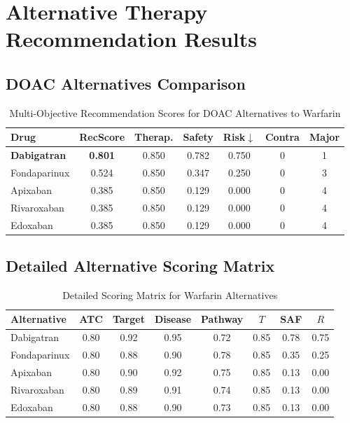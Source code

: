 \documentclass[11pt,a4paper]{article}
\begin{document}
\section{Alternative Therapy Recommendation Results}

\subsection{DOAC Alternatives Comparison}

\begin{table}[H]
\centering
\caption{Multi-Objective Recommendation Scores for DOAC Alternatives to Warfarin}
\label{tab:doac_alternatives}
\begin{tabular}{@{}lcccccc@{}}
\toprule
\textbf{Drug} & \textbf{RecScore} & \textbf{Therap.} & \textbf{Safety} & \textbf{Risk$\downarrow$} & \textbf{Contra} & \textbf{Major} \\
\midrule
\textbf{Dabigatran} & \textbf{0.801} & 0.850 & 0.782 & 0.750 & 0 & 1 \\
Fondaparinux & 0.524 & 0.850 & 0.347 & 0.250 & 0 & 3 \\
Apixaban & 0.385 & 0.850 & 0.129 & 0.000 & 0 & 4 \\
Rivaroxaban & 0.385 & 0.850 & 0.129 & 0.000 & 0 & 4 \\
Edoxaban & 0.385 & 0.850 & 0.129 & 0.000 & 0 & 4 \\
\bottomrule
\end{tabular}
\end{table}

\subsection{Detailed Alternative Scoring Matrix}

\begin{table}[H]
\centering
\caption{Detailed Scoring Matrix for Warfarin Alternatives}
\label{tab:detailed_scoring}
\begin{tabular}{@{}lccccccc@{}}
\toprule
\textbf{Alternative} & \textbf{ATC} & \textbf{Target} & \textbf{Disease} & \textbf{Pathway} & \textbf{$T$} & \textbf{SAF} & \textbf{$R$} \\
\midrule
Dabigatran & 0.80 & 0.92 & 0.95 & 0.72 & 0.85 & 0.78 & 0.75 \\
Fondaparinux & 0.80 & 0.88 & 0.90 & 0.78 & 0.85 & 0.35 & 0.25 \\
Apixaban & 0.80 & 0.90 & 0.92 & 0.75 & 0.85 & 0.13 & 0.00 \\
Rivaroxaban & 0.80 & 0.89 & 0.91 & 0.74 & 0.85 & 0.13 & 0.00 \\
Edoxaban & 0.80 & 0.88 & 0.90 & 0.73 & 0.85 & 0.13 & 0.00 \\
\bottomrule
\end{tabular}
\end{table}
\end{document}
